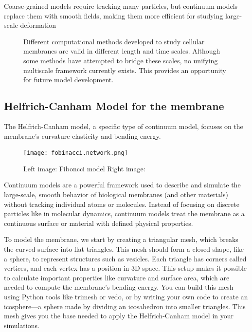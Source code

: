 \documentclass[12pt]{article}
\begin{document}
\begin{flushleft}
Coarse-grained models require tracking many particles, but continuum models replace them with smooth fields, making them more efficient for studying large-scale deformation


\begin{figure}[!ht]
  \centering
  \caption{Different computational methods developed to study cellular membranes are valid in different length and time scales. Although some methods have attempted to bridge these scales, no unifying multiscale framework currently exists. This provides an opportunity for future model development.\cite{chabanon2017systems}}
\end{figure}












\subsection*{Helfrich-Canham Model for the membrane}

\setlength{\parindent}{4em}The Helfrich-Canham model, a specific type of continuum model, focuses on the membrane's curvature elasticity and bending energy\cite{Bassereau2014}.





\begin{figure}[!ht]
  \centering
  \texttt{[image: fobinacci.network.png]} 
  \caption{Left image: Fiboncci model  Right image: }
\end{figure}

Continuum models are a powerful framework used to describe and simulate the large-scale, smooth behavior of biological membranes (and other materials) without tracking individual atoms or molecules. Instead of focusing on discrete particles like in molecular dynamics, continuum models treat the membrane as a continuous surface or material with defined physical properties.

To model the membrane, we start by creating a triangular mesh, which breaks the curved surface into flat triangles. This mesh should form a closed shape, like a sphere, to represent structures such as vesicles. Each triangle has corners called vertices, and each vertex has a position in 3D space. This setup makes it possible to calculate important properties like curvature and surface area, which are needed to compute the membrane’s bending energy. You can build this mesh using Python tools like trimesh or vedo, or by writing your own code to create an icosphere—a sphere made by dividing an icosahedron into smaller triangles. This mesh gives you the base needed to apply the Helfrich-Canham model in your simulations.


\end{flushleft}
\end{document}
